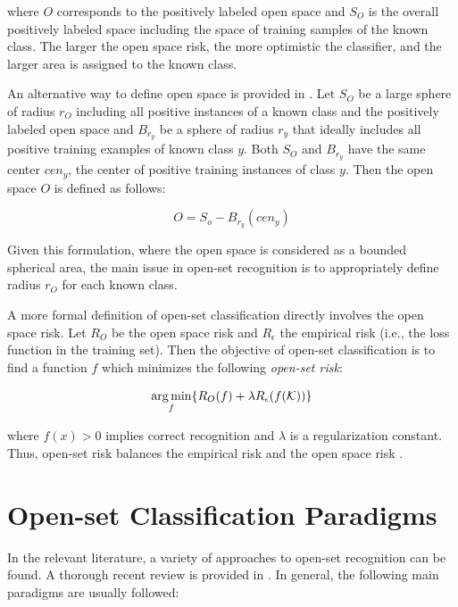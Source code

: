 \noindent
where $O$ corresponds to the positively labeled open space and $S_O$ is the overall positively labeled space including the space of training samples of the known class. The larger the open space risk, the more optimistic the classifier, and the larger area is assigned to the known class.  

An alternative way to define open space is provided in  \parencite{fei2016breaking}. Let $S_O$ be a large sphere of radius $r_O$ including all positive instances of a known class and the positively labeled open space and $B_{r_y}$ be a sphere of radius $r_y$ that ideally includes all positive training examples of known class $y$. Both $S_O$ and $B_{r_y}$ have the same center $cen_y$, the center of positive training instances of class $y$. Then the open space $O$ is defined as follows:

\begin{equation}\label{chap:eval_methods:eq:openspace_spherical_constrained}
	O = S_{o} - B_{r_{y}}(cen_{y})
\end{equation}

Given this formulation, where the open space is considered as a bounded spherical area, the main issue in open-set recognition is to appropriately define radius $r_O$ for each known class.

A more formal definition of open-set classification directly involves the open space risk. Let $R_{O}$ be the open space risk and $R_{\epsilon}$ the empirical risk (i.e., the loss function in the training set). Then the objective of open-set classification is to find a function $f$ which minimizes the following \textit{open-set risk}: 

\begin{equation}
\label{eq:open_space_risk}
\operatorname*{arg\,min}_{f} \{R_{O}(f ) + \lambda R_{\epsilon}(f (\mathcal{K}))\}
\end{equation}

\noindent where $f (x) > 0$ implies correct recognition and $\lambda$ is a regularization constant. Thus, open-set risk balances the empirical risk and the open space risk \parencite{geng2018recent}. 

\section{Open-set Classification Paradigms}
\label{chap:openset:sec:Open_Set_Classification_Paradigms}

In the relevant literature, a variety of approaches to open-set recognition can be found. A thorough recent review is provided in \parencite{geng2018recent}. In general, the following main paradigms are usually followed:

